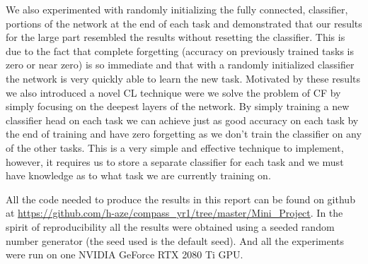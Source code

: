 We also experimented with randomly initializing the fully connected, classifier, portions of the network at the end of each task and demonstrated that our results for the large part resembled the results without resetting the classifier. This is due to the fact that complete forgetting (accuracy on previously trained tasks is zero or near zero) is so immediate and that with a randomly initialized classifier the network is very quickly able to learn the new task. Motivated by these results we also introduced a novel CL technique were we solve the problem of CF by simply focusing on the deepest layers of the network. By simply training a new classifier head on each task we can achieve just as good accuracy on each task by the end of training and have zero forgetting as we don't train the classifier on any of the other tasks. This is a very simple and effective technique to implement, however, it requires us to store a separate classifier for each task and we must have knowledge as to what task we are currently training on.

All the code needed to produce the results in this report can be found on github at \url{https://github.com/h-aze/compass_yr1/tree/master/Mini_Project}. In the spirit of reproducibility all the results were obtained using a seeded random number generator (the seed used is the default seed). And all the experiments were run on one NVIDIA GeForce RTX 2080 Ti GPU. 